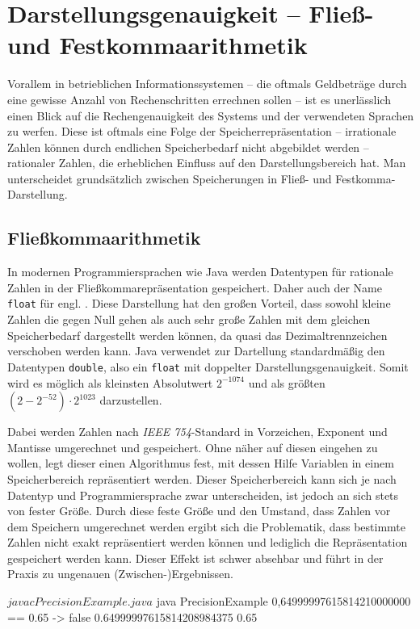 \section{Darstellungsgenauigkeit -- Fließ- und Festkommaarithmetik}
Vorallem in betrieblichen Informationssystemen -- die oftmals Geldbeträge durch eine gewisse Anzahl von Rechenschritten errechnen sollen -- ist es unerlässlich einen Blick auf die Rechengenauigkeit des Systems und der verwendeten Sprachen zu werfen. Diese ist oftmals eine Folge der Speicherrepräsentation -- irrationale Zahlen können durch endlichen Speicherbedarf nicht abgebildet werden -- rationaler Zahlen, die erheblichen Einfluss auf den Darstellungsbereich hat. Man unterscheidet grundsätzlich zwischen Speicherungen in Fließ- und Festkomma-Darstellung.
 
\subsection*{Fließkommaarithmetik}
In modernen Programmiersprachen wie Java werden Datentypen für rationale Zahlen in der Fließkommarepräsentation gespeichert. Daher auch der Name \texttt{float} für engl. . Diese Darstellung hat den großen Vorteil, dass sowohl kleine Zahlen die gegen Null gehen als auch sehr große Zahlen mit dem gleichen Speicherbedarf dargestellt werden können, da quasi das Dezimaltrennzeichen verschoben werden kann. Java verwendet zur Dartellung standardmäßig den Datentypen \texttt{double}, also ein \texttt{float} mit doppelter Darstellungsgenauigkeit. Somit wird es möglich als kleinsten Absolutwert $2^{-1074}$ und als größten $(2 - 2^{-52}) \cdot 2^{1023}$ darzustellen.

Dabei werden Zahlen nach \textit{IEEE 754}-Standard in Vorzeichen, Exponent und Mantisse umgerechnet und gespeichert. Ohne näher auf diesen eingehen zu wollen, legt dieser einen Algorithmus fest, mit dessen Hilfe Variablen in einem Speicherbereich repräsentiert werden. Dieser Speicherbereich kann sich je nach Datentyp und Programmiersprache zwar unterscheiden, ist jedoch an sich stets von fester Größe. Durch diese feste Größe und den Umstand, dass Zahlen vor dem Speichern umgerechnet werden ergibt sich die Problematik, dass bestimmte Zahlen nicht exakt repräsentiert werden können und lediglich die  Repräsentation gespeichert werden kann. Dieser Effekt ist schwer absehbar und führt in der Praxis zu ungenauen (Zwischen-)Ergebnissen.

\sepCodeAndOutputCheck
\begin{shellwindow}
$ javac PrecisionExample.java 
$ java PrecisionExample
0,64999997615814210000000 == 0.65 -> false
0.64999997615814208984375
0.65
\end{shellwindow}

